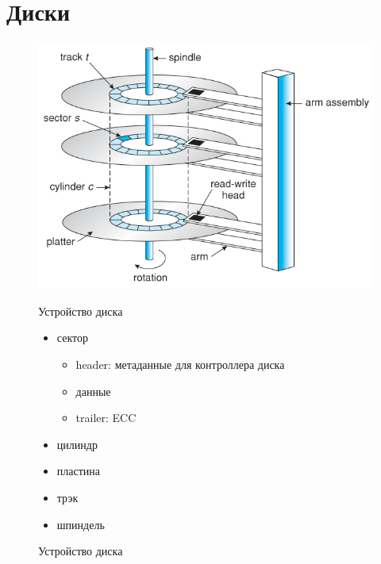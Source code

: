 \documentclass[../../lectures.tex]{subfiles}
\begin{document}
\section{Диски}
\begin{figure}[H]
\begin{minipage}[c]{0.6\linewidth}
\centering
\includegraphics[width=\textwidth]{images/disk-mechanism.jpg}
\caption{Устройство диска}
\end{minipage}
\begin{minipage}[c]{0.4\linewidth}
\centering
Устройство диска
\begin{itemize}
  \item сектор
        \begin{itemize}
            \item header: метаданные для контроллера диска
            \item данные
            \item trailer: ECC
        \end{itemize}
  \item цилиндр
  \item пластина
  \item трэк
  \item шпиндель
\end{itemize}
\end{minipage}
\end{figure}
\end{document}
